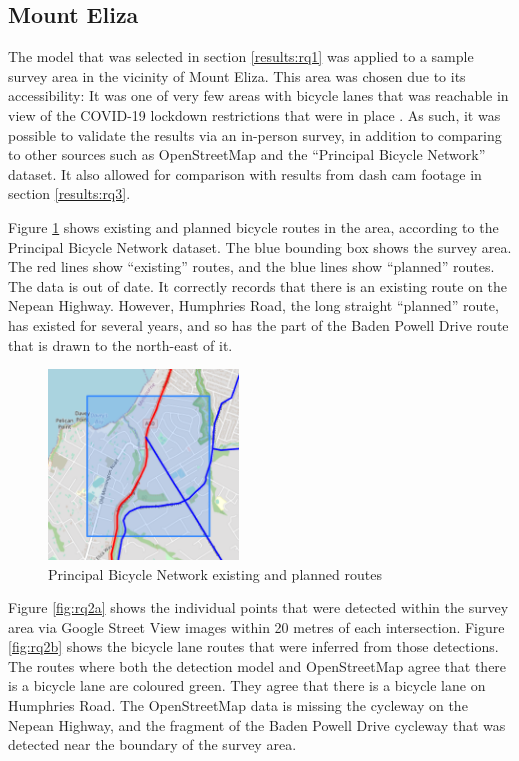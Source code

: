 \documentclass[11pt,twoside]{report}
\begin{document}
\subsection{Mount Eliza}

The model that was selected in section \ref{results:rq1} was applied to a sample survey area in the vicinity of Mount Eliza.  This area was chosen due to its accessibility:  It was one of very few areas with bicycle lanes that was reachable in view of the COVID-19 lockdown restrictions that were in place \cite{lockdown_record} \cite{lockdown_5km}.  As such, it was possible to validate the results via an in-person survey, in addition to comparing to other sources such as OpenStreetMap and the ``Principal Bicycle Network'' dataset.  It also allowed for comparison with results from dash cam footage in section \ref{results:rq3}.

Figure \ref{fig:rq2c} shows existing and planned bicycle routes in the area, according to the Principal Bicycle Network dataset.  The blue bounding box shows the survey area.  The red lines show ``existing'' routes, and the blue lines show ``planned'' routes.  The data is out of date.  It correctly records that there is an existing route on the Nepean Highway.  However, Humphries Road, the long straight ``planned'' route, has existed for several years, and so has the part of the Baden Powell Drive route that is drawn to the north-east of it.

\begin{figure}[h]
\centering
\includegraphics[width=0.45\textwidth]{map1_5.png}
\caption{Principal Bicycle Network existing and planned routes}
\label{fig:rq2c}
\end{figure}

Figure \ref{fig:rq2a} shows the individual points that were detected within the survey area via Google Street View images within 20 metres of each intersection.  Figure \ref{fig:rq2b} shows the bicycle lane routes that were inferred from those detections.  The routes where both the detection model and OpenStreetMap agree that there is a bicycle lane are coloured green.  They agree that there is a bicycle lane on Humphries Road.  The OpenStreetMap data is missing the cycleway on the Nepean Highway, and the fragment of the Baden Powell Drive cycleway that was detected near the boundary of the survey area.
\end{document}
